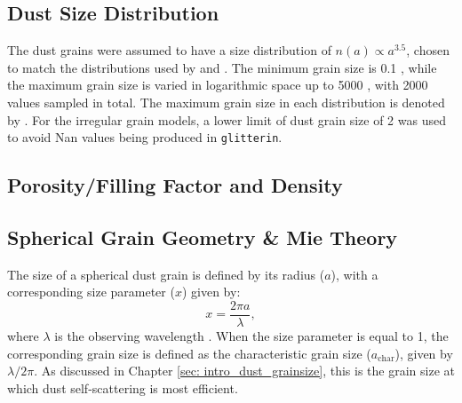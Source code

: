 \subsection{Dust Size Distribution}
\label{sec: ch5_amax_distribution}

The dust grains were assumed to have a size distribution of $n(a)\propto a^{3.5}$, chosen to match the distributions used by \cite{Kataoka_2015} and \cite{Zhang2023}. The minimum grain size is 0.1 \micronNS, while the maximum grain size is varied in logarithmic space up to 5000 \micronNS, with 2000 values sampled in total. The maximum grain size in each distribution is denoted by \amaxNS. For the irregular grain models, a lower limit of dust grain size of 2 \micron was used to avoid Nan values being produced in \texttt{glitterin}.



\subsection{Porosity/Filling Factor and Density}










\subsection{Spherical Grain Geometry \& Mie Theory}




 
The size of a spherical dust grain is defined by its radius ($a$), with a corresponding size parameter ($x$) given by:
\begin{equation}
 x = \frac{2\pi a}{\lambda},
 \label{eq: size_parameter}
\end{equation}
\noindent where $\lambda$ is the observing wavelength \citep{Zhang2023}. When the size parameter is equal to 1, the corresponding grain size is defined as the characteristic grain size ($a_{\text{char}}$), given by $\lambda/2\pi$. As discussed in Chapter \ref{sec: intro_dust_grainsize}, this is the grain size at which dust self-scattering is most efficient. 



